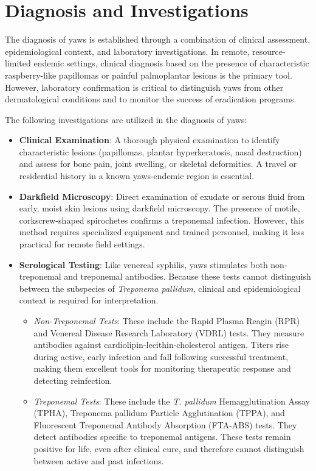 \section*{Diagnosis and Investigations}
The diagnosis of yaws is established through a combination of clinical assessment, epidemiological context, and laboratory investigations. In remote, resource-limited endemic settings, clinical diagnosis based on the presence of characteristic raspberry-like papillomas or painful palmoplantar lesions is the primary tool. However, laboratory confirmation is critical to distinguish yaws from other dermatological conditions and to monitor the success of eradication programs.

The following investigations are utilized in the diagnosis of yaws:
\begin{itemize}
    \item \textbf{Clinical Examination}: A thorough physical examination to identify characteristic lesions (papillomas, plantar hyperkeratosis, nasal destruction) and assess for bone pain, joint swelling, or skeletal deformities. A travel or residential history in a known yaws-endemic region is essential.
    \item \textbf{Darkfield Microscopy}: Direct examination of exudate or serous fluid from early, moist skin lesions using darkfield microscopy. The presence of motile, corkscrew-shaped spirochetes confirms a treponemal infection. However, this method requires specialized equipment and trained personnel, making it less practical for remote field settings.
    \item \textbf{Serological Testing}: Like venereal syphilis, yaws stimulates both non-treponemal and treponemal antibodies. Because these tests cannot distinguish between the subspecies of \textit{Treponema pallidum}, clinical and epidemiological context is required for interpretation.
    \begin{itemize}
        \item \textit{Non-Treponemal Tests}: These include the Rapid Plasma Reagin (RPR) and Venereal Disease Research Laboratory (VDRL) tests. They measure antibodies against cardiolipin-lecithin-cholesterol antigen. Titers rise during active, early infection and fall following successful treatment, making them excellent tools for monitoring therapeutic response and detecting reinfection.
        \item \textit{Treponemal Tests}: These include the \textit{T. pallidum} Hemagglutination Assay (TPHA), Treponema pallidum Particle Agglutination (TPPA), and Fluorescent Treponemal Antibody Absorption (FTA-ABS) tests. They detect antibodies specific to treponemal antigens. These tests remain positive for life, even after clinical cure, and therefore cannot distinguish between active and past infections.

\end{itemize}
\end{itemize}
